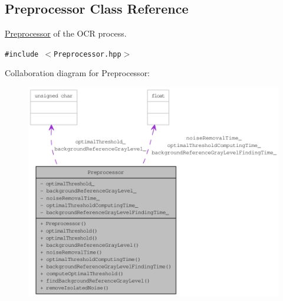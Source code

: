 \hypertarget{class_preprocessor}{
\subsection{Preprocessor Class Reference}
\label{class_preprocessor}
}
\hyperlink{class_preprocessor}{Preprocessor} of the OCR process.  


{\tt \#include $<$Preprocessor.hpp$>$}

Collaboration diagram for Preprocessor:\nopagebreak
\begin{figure}[H]
\begin{center}
\leavevmode
\includegraphics[width=400pt]{class_preprocessor__coll__graph}
\end{center}
\end{figure}
